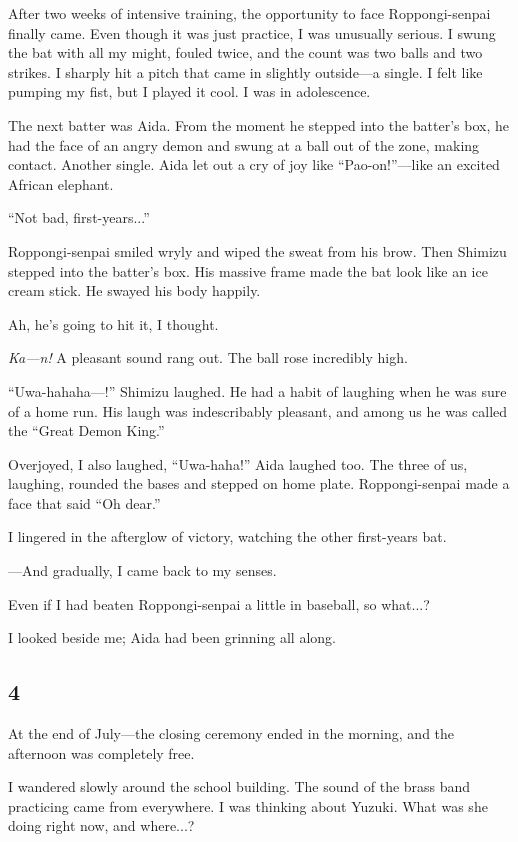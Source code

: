 \documentclass[
    a4paper,
    12pt,
    twoside,
    openany,
    UTF8,
    fontset=windows
]{ctexbook}
\begin{document}
After two weeks of intensive training, the opportunity to face Roppongi-senpai finally came. Even though it was just practice, I was unusually serious. I swung the bat with all my might, fouled twice, and the count was two balls and two strikes. I sharply hit a pitch that came in slightly outside---a single. I felt like pumping my fist, but I played it cool. I was in adolescence.

The next batter was Aida. From the moment he stepped into the batter's box, he had the face of an angry demon and swung at a ball out of the zone, making contact. Another single. Aida let out a cry of joy like ``Pao-on!''---like an excited African elephant.

``Not bad, first-years...''

Roppongi-senpai smiled wryly and wiped the sweat from his brow. Then Shimizu stepped into the batter's box. His massive frame made the bat look like an ice cream stick. He swayed his body happily.

Ah, he's going to hit it, I thought.

\textit{Ka---n!} A pleasant sound rang out. The ball rose incredibly high.

``Uwa-hahaha---!'' Shimizu laughed. He had a habit of laughing when he was sure of a home run. His laugh was indescribably pleasant, and among us he was called the ``Great Demon King.''

Overjoyed, I also laughed, ``Uwa-haha!'' Aida laughed too. The three of us, laughing, rounded the bases and stepped on home plate. Roppongi-senpai made a face that said ``Oh dear.''

I lingered in the afterglow of victory, watching the other first-years bat.

---And gradually, I came back to my senses.

Even if I had beaten Roppongi-senpai a little in baseball, so what...?

I looked beside me; Aida had been grinning all along.


\subsection*{4}

At the end of July---the closing ceremony ended in the morning, and the afternoon was completely free.

I wandered slowly around the school building. The sound of the brass band practicing came from everywhere. I was thinking about Yuzuki. What was she doing right now, and where...?
\end{document}
